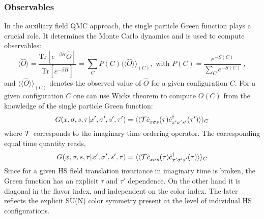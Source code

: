 \subsubsection{Observables}
\label{Observables.General}
In the auxiliary field QMC approach, the single particle Green function plays a crucial role.  It determines the Monte Carlo dynamics and is used to compute  observables:
\begin{equation}\label{eqn:obs}
\langle \hat{O}  \rangle  = \frac{ \text{Tr}   \left[ e^{- \beta \hat{H}}  \hat{O}   \right] }{ \text{Tr}   \left[ e^{- \beta \hat{H}}  \right] } =   \sum_{C}   P(C) 
   \langle \langle \hat{O}  \rangle \rangle_{(C)} , \text{   with   } 
  P(C)   = \frac{ e^{-S(C)}}{\sum_C e^{-S(C)}}\;,
\end{equation}
and $\langle \langle \hat{O}  \rangle \rangle_{(C)} $ denotes the observed value of $\hat{O}$ for a given configuration $C$.
For a given configuration $C$  one can use Wicks theorem to compute $O (C) $   from the knowledge of the single particle Green function: 
\begin{equation}
       G( x,\sigma,s, \tau |    x',\sigma',s', \tau')   =       \langle \langle {\cal T} \hat{c}^{\phantom\dagger}_{x \sigma s} (\tau)  \hat{c}^{\dagger}_{x' \sigma' s'} (\tau') \rangle \rangle_{C}
\end{equation}
where $ {\cal T} $ corresponds to the imaginary time ordering operator.   The  corresponding equal time quantity reads, 
\begin{equation}
       G( x,\sigma,s, \tau |    x',\sigma',s', \tau)   =       \langle \langle {\cal T} \hat{c}^{\phantom\dagger}_{x \sigma s} (\tau)  \hat{c}^{\dagger}_{x' \sigma' s'} (\tau) \rangle \rangle_{C}
\end{equation}
Since  for a given HS field translation invariance in imaginary time is broken, the Green function has an explicit $\tau$ and $\tau'$ dependence.   On the other hand it is diagonal in the flavor index, and independent on the color index.  The later reflects the  explicit SU(N)   color symmetry present at the level of individual HS configurations. 

